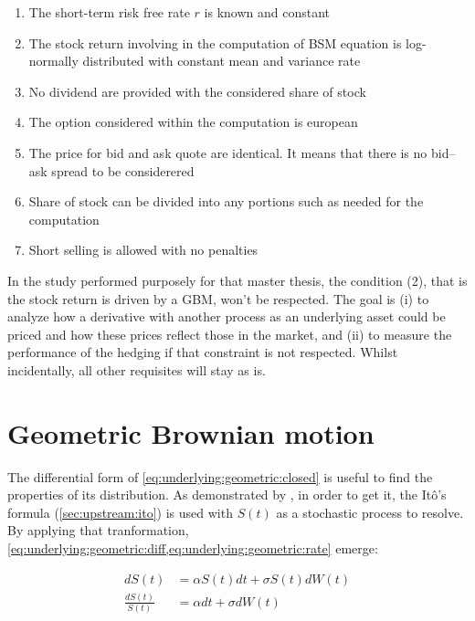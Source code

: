 \documentclass[12pt]{report}
\newcommand{\dBm}{dW\left(t\right)}
\newcommand{\St}{S\left(t\right)}
\newcommand{\dSt}{dS\left(t\right)}
\newcommand{\dSr}{\frac{\dSt}{\St}}
\newcommand{\Scontinousdiff}{d\St &= \alpha \St dt + \sigma \St \dBm}
\newcommand{\Scontinuousrate}{\dSr &= \alpha dt + \sigma \dBm}
\begin{document}
\begin{enumerate}
  \item The short-term risk free rate $r$ is known and constant
  \item The stock return involving in the computation of BSM equation is log-normally distributed with constant mean and variance rate
  \item No dividend are provided with the considered share of stock
  \item The option considered within the computation is european
  \item The price for bid and ask quote are identical. It means that there is no bid--ask spread to be considerered
  \item Share of stock can be divided into any portions such as needed for the computation
  \item Short selling is allowed with no penalties
\end{enumerate}

In the study performed purposely for that master thesis, the condition (2), that is the stock return is driven by a GBM, won't be respected. 
The goal is (i) to analyze how a derivative with another process as an underlying asset could be priced and how these prices reflect those in the market, and (ii) to measure the performance of the hedging if that constraint is not respected.
Whilst incidentally, all other requisites will stay as is.


\section{Geometric Brownian motion}
\label{sec:underlying:derivation}

The differential form of \cref{eq:underlying:geometric:closed} is useful to find the properties of its distribution.
As demonstrated by \citet{shreve}, in order to get it, the Itô's formula (\cref{sec:upstream:ito}) is used with $S(t)$ as a stochastic process to resolve. 
By applying that tranformation, \cref{eq:underlying:geometric:diff,eq:underlying:geometric:rate} emerge:
 
\begin{center}
  \begin{subequations}
    \begin{align}
      \Scontinousdiff \label{eq:underlying:geometric:diff} \\
      \Scontinuousrate \label{eq:underlying:geometric:rate}
    \end{align}
  \end{subequations}
\end{center}
\end{document}
